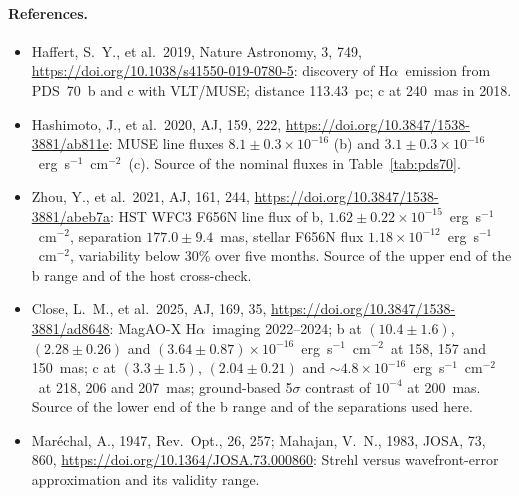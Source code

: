 \documentclass[11pt]{article}
\newcommand{\Ha}{H$\alpha$}
\newcommand{\ergcgs}{erg~s$^{-1}$~cm$^{-2}$}
\begin{document}
\paragraph{References.}
\begin{itemize}[leftmargin=*]
  \item Haffert, S.~Y., et al.\ 2019, Nature Astronomy, 3, 749, \url{https://doi.org/10.1038/s41550-019-0780-5}: discovery of \Ha\ emission from PDS~70~b and c with VLT/MUSE; distance 113.43~pc; c at 240~mas in 2018.
  \item Hashimoto, J., et al.\ 2020, AJ, 159, 222, \url{https://doi.org/10.3847/1538-3881/ab811e}: MUSE line fluxes $8.1 \pm 0.3 \times 10^{-16}$ (b) and $3.1 \pm 0.3 \times 10^{-16}$~\ergcgs\ (c). Source of the nominal fluxes in Table~\ref{tab:pds70}.
  \item Zhou, Y., et al.\ 2021, AJ, 161, 244, \url{https://doi.org/10.3847/1538-3881/abeb7a}: HST WFC3 F656N line flux of b, $1.62 \pm 0.22 \times 10^{-15}$~\ergcgs, separation $177.0 \pm 9.4$~mas, stellar F656N flux $1.18 \times 10^{-12}$~\ergcgs, variability below 30\% over five months. Source of the upper end of the b range and of the host cross-check.
  \item Close, L.~M., et al.\ 2025, AJ, 169, 35, \url{https://doi.org/10.3847/1538-3881/ad8648}: MagAO-X \Ha\ imaging 2022--2024; b at $(10.4 \pm 1.6)$, $(2.28 \pm 0.26)$ and $(3.64 \pm 0.87) \times 10^{-16}$~\ergcgs\ at 158, 157 and 150~mas; c at $(3.3 \pm 1.5)$, $(2.04 \pm 0.21)$ and $\sim\!4.8 \times 10^{-16}$~\ergcgs\ at 218, 206 and 207~mas; ground-based 5$\sigma$ contrast of $10^{-4}$ at 200~mas. Source of the lower end of the b range and of the separations used here.
  \item Mar\'echal, A., 1947, Rev.\ Opt., 26, 257; Mahajan, V.~N., 1983, JOSA, 73, 860, \url{https://doi.org/10.1364/JOSA.73.000860}: Strehl versus wavefront-error approximation and its validity range.
\end{itemize}
\end{document}
